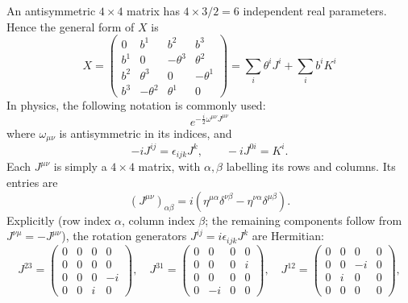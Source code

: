 \documentclass[11pt,a4paper]{article}
\begin{document}
An antisymmetric $4\times4$ matrix has $4\times3/2=6$ independent real parameters. Hence the general form of $X$ is
\begin{equation*}
X=\begin{pmatrix}
0&b^1&b^2&b^3\\
b^1&0&-\theta^3&\theta^2\\
b^2&\theta^3&0&-\theta^1\\
b^3&-\theta^2&\theta^1&0
\end{pmatrix}
=\sum_i\theta^iJ^i+\sum_ib^iK^i
\tag{0.33}\label{eq:0.33}
\end{equation*}
In physics, the following notation is commonly used:
\begin{equation*}
e^{-\frac i2\omega^{\mu\nu}J^{\mu\nu}}
\tag{0.34}\label{eq:0.34}
\end{equation*}
where $\omega_{\mu\nu}$ is antisymmetric in its indices, and
\begin{equation*}
-iJ^{ij}=\epsilon_{ijk}J^k,\qquad -iJ^{0i}=K^i.
\tag{0.35}\label{eq:0.35}
\end{equation*}
Each $J^{\mu\nu}$ is simply a $4\times4$ matrix, with $\alpha,\beta$ labelling its rows and columns. Its entries are
\begin{equation*}
(J^{\mu\nu})_{\alpha\beta}=i\left(\eta^{\mu\alpha}\delta^{\nu\beta}-\eta^{\nu\alpha}\delta^{\mu\beta}\right).
\tag{0.36}\label{eq:0.36}
\end{equation*}
Explicitly (row index $\alpha$, column index $\beta$; the remaining components follow from $J^{\nu\mu}=-J^{\mu\nu}$), the rotation generators $J^{ij}=i\epsilon_{ijk}J^k$ are Hermitian:
\begin{equation*}
J^{23}=\begin{pmatrix}0&0&0&0\\0&0&0&0\\0&0&0&-i\\0&0&i&0\end{pmatrix},\quad
J^{31}=\begin{pmatrix}0&0&0&0\\0&0&0&i\\0&0&0&0\\0&-i&0&0\end{pmatrix},\quad
J^{12}=\begin{pmatrix}0&0&0&0\\0&0&-i&0\\0&i&0&0\\0&0&0&0\end{pmatrix},
\tag{0.37}\label{eq:0.37}
\end{equation*}
\end{document}
